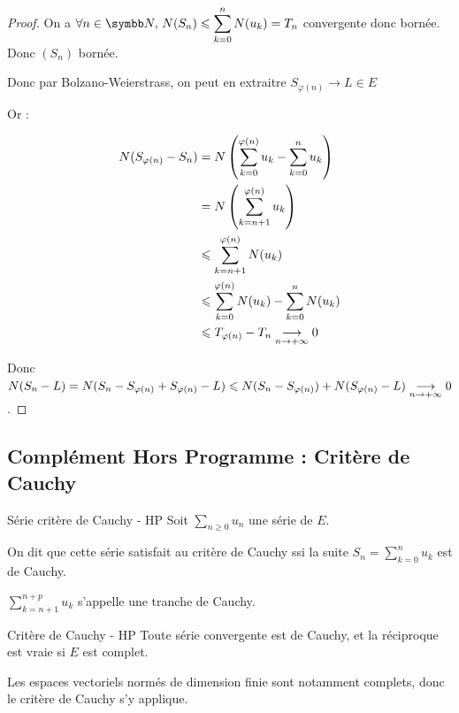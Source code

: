 \begin{proof}
    On a $\ds \forall n \in \N, \, N(S_n) \leqslant \sum_{k = 0}^n N(u_k) = T_n$ convergente donc bornée. 
    Donc $(S_n)$ bornée. 

    Donc par Bolzano-Weierstrass, on peut en extraitre $S_{\varphi(n)} \to L \in E$

    Or :

    \begin{align*}
        N(S_{\varphi(n)} - S_n) & = N\left(\sum_{k = 0}^{\varphi(n)} u_k - \sum_{k = 0}^n u_k\right) \\
                                & = N \left(\sum_{k = n + 1}^{\varphi(n)} u_k\right) \\
                                & \leqslant \sum_{k = n + 1}^{\varphi(n)} N(u_k) \\
                                & \leqslant \sum_{k = 0}^{\varphi(n)} N(u_k) - \sum_{k = 0}^n N(u_k) \\
                                & \leqslant T_{\varphi(n)} - T_n \underset{n \to +\infty}{\longrightarrow} 0
    \end{align*}

    Donc $N(S_n - L) = N(S_n - S_{\varphi(n)} + S_{\varphi(n)} - L)
    \leqslant N(S_n - S_{\varphi(n)}) + N(S_{\varphi(n)} - L) \underset{n \to + \infty}{\longrightarrow} 0$.
\end{proof}

\subsection{Complément Hors Programme : Critère de Cauchy}

\begin{definition}{Série critère de Cauchy - HP}{}
    Soit $\sum_{n \geqslant 0} u_n$ une série de $E$.

    On dit que cette série satisfait au critère de Cauchy ssi la suite $\displaystyle S_n = \sum_{k = 0}^n u_k$ 
    est de Cauchy. 

    $\displaystyle \sum_{k = n + 1}^{n + p} u_k$ s'appelle une tranche de Cauchy. 
\end{definition}

\begin{theoreme}{Critère de Cauchy - HP}{}
    Toute série convergente est de Cauchy, et la réciproque est vraie si $E$ est complet.
\end{theoreme}

\begin{remarque}
    Les espaces vectoriels normés de dimension finie sont notamment complets, donc 
    le critère de Cauchy s'y applique.
\end{remarque}

